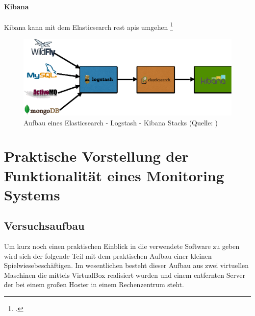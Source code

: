 \documentclass[12pt,a4paper,parskip,listof=totoc,bibliography=totoc]{scrreprt}
\begin{document}
	\subsubsection{Kibana}
	Kibana kann mit dem Elasticsearch \acrshort{rest} \acrshort{api}s umgehen \footcite{kibana}
	\begin{figure}[h!]
		\centering
		\includegraphics[width=1\textwidth]{pics/elk-stack.eps}
		\caption[Aufbau eines Elasticsearch - Logstash - Kibana Stacks]{Aufbau eines Elasticsearch - Logstash - Kibana Stacks (Quelle: \textcite{elkstackpic})}
		\label{fig:elk}
	\end{figure}
	\clearpage
	\chapter{Praktische Vorstellung der Funktionalität eines Monitoring Systems}
	\section{Versuchsaufbau}
	Um kurz noch einen praktischen Einblick in die verwendete Software zu geben wird sich der folgende Teil mit dem praktischen Aufbau einer kleinen \glqq Spielwiese\grqq beschäftigen. Im wesentlichen besteht dieser Aufbau aus zwei virtuellen Maschinen die mittels VirtualBox realisiert wurden und einem entfernten Server der bei einem großen Hoster in einem Rechenzentrum steht.
\end{document}
